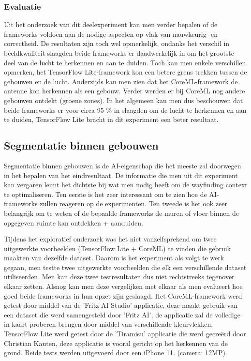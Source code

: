 \subsubsection{Evaluatie}
Uit het onderzoek van dit deelexperiment kan men verder bepalen of de frameworks voldoen aan de nodige aspecten op vlak van nauwkeurig -en correctheid. De resultaten zijn toch wel opmerkelijk, ondanks het verschil in beeldkwaliteit slaagden beide frameworks er daadwerkelijk in om het grootste deel van de lucht te herkennen en aan te duiden. Toch kan men enkele verschillen opmerken, het TensorFlow Lite-framework kon een betere grens trekken tussen de gebouwen en de lucht. Anderzijds kan men zien dat het CoreML-framework de antenne  kon herkennen als een gebouw. Verder werden er bij CoreML nog andere gebouwen ontdekt (groene zones). In het algemeen kan men dus beschouwen dat beide frameworks er voor circa 95 \% in slaagden om de lucht te herkennen en aan te duiden, TensorFlow Lite bracht in dit experiment een beter resultaat.

\subsection{Segmentatie binnen gebouwen}
Segmentatie binnen gebouwen is de AI-eigenschap die het meeste zal doorwegen in het bepalen van het eindresultaat. De informatie die men uit dit experiment kan vergaren leunt het dichtste bij wat men nodig heeft om de wayfinding context te optimaliseren. Ten eerste is het zeer interessant om te zien hoe de AI-frameworks zullen reageren op de experimenten. Ten tweede is het ook zeer belangrijk om te weten of de bepaalde frameworks de muren of vloer binnen de opgegeven ruimte kan ontdekken + aanduiden. 

Tijdens het exploratief onderzoek was het niet vanzelfsprekend om twee uitgewerkte voorbeelden (TensorFlow Lite + CoreML) te vinden die gebruik maakten van dezelfde dataset. Daarom is het  experiment als volgt te werk gegaan, men testte twee uitgewerkte voorbeelden die elk een verschillende dataset utiliseerden. Men kan deze twee testresultaten dus niet rechtstreeks tegenover elkaar zetten. Alsnog kan men deze vergelijken met elkaar als men evalueert hoe goed beide frameworks in hun opzet zijn geslaagd. Het CoreML-framework werd getest door middel van de 'Fritz AI Studio' applicatie, deze maakt gebruik van een dataset die werd samengesteld door 'Fritz AI', de applicatie zal de volledige in kaart proberen brengen door middel van verschillende kleurvlekken. TensorFlow Lite werd getest door de 'Tiramisu' applicatie die werd gecreërd door Christian Kauten, deze applicatie is vooral gericht op het herkennen van de grond. Beide tests werden uitgevoerd door een iPhone 11. (camera: 12MP). 

